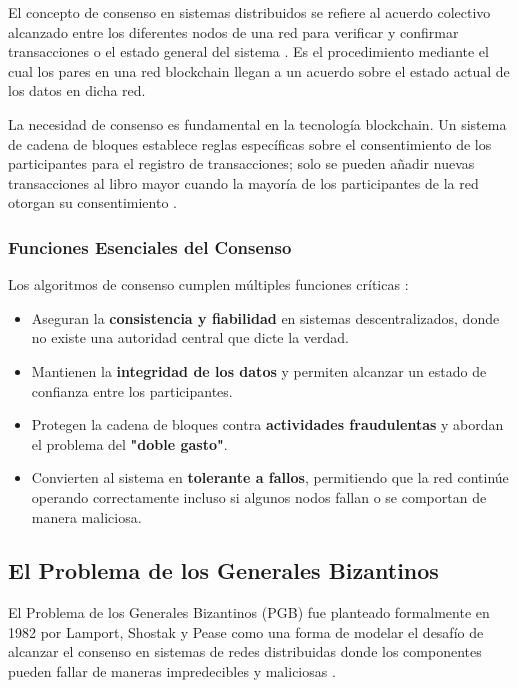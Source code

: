\documentclass[spanish,12pt,letterpaper]{report}
\begin{document}
El concepto de consenso en sistemas distribuidos se refiere al acuerdo colectivo alcanzado entre los diferentes nodos de una red para verificar y confirmar transacciones o el estado general del sistema \parencite{crypto2025consensus}. Es el procedimiento mediante el cual los pares en una red blockchain llegan a un acuerdo sobre el estado actual de los datos en dicha red.

La necesidad de consenso es fundamental en la tecnología blockchain. Un sistema de cadena de bloques establece reglas específicas sobre el consentimiento de los participantes para el registro de transacciones; solo se pueden añadir nuevas transacciones al libro mayor cuando la mayoría de los participantes de la red otorgan su consentimiento \parencite{aws2025blockchain}.

\subsubsection{Funciones Esenciales del Consenso}

Los algoritmos de consenso cumplen múltiples funciones críticas \parencite{crypto2025consensus}:

\begin{itemize}
    \item Aseguran la \textbf{consistencia y fiabilidad} en sistemas descentralizados, donde no existe una autoridad central que dicte la verdad.
    \item Mantienen la \textbf{integridad de los datos} y permiten alcanzar un estado de confianza entre los participantes.
    \item Protegen la cadena de bloques contra \textbf{actividades fraudulentas} y abordan el problema del \textbf{"doble gasto"}.
    \item Convierten al sistema en \textbf{tolerante a fallos}, permitiendo que la red continúe operando correctamente incluso si algunos nodos fallan o se comportan de manera maliciosa.
\end{itemize}

\subsection{El Problema de los Generales Bizantinos}

El Problema de los Generales Bizantinos (PGB) fue planteado formalmente en 1982 por Lamport, Shostak y Pease como una forma de modelar el desafío de alcanzar el consenso en sistemas de redes distribuidas donde los componentes pueden fallar de maneras impredecibles y maliciosas \parencite{amores2020blockchain}.
\end{document}
